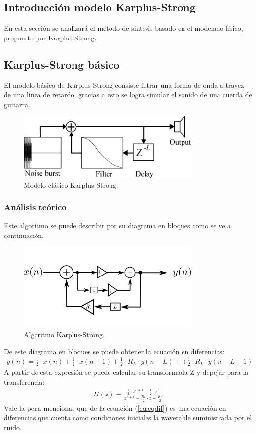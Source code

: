 



\subsection{Introducción modelo Karplus-Strong}
En esta sección se analizará el método de sintesis basado en el modelado físico, propuesto por Karplus-Strong.
\subsection{Karplus-Strong básico}
El modelo básico de Karplus-Strong consiste filtrar una forma de onda a travez de una linea de retardo, gracias a esto se logra simular el sonido de una cuerda de guitarra.
\begin{figure}[H]
	\centering
	\includegraphics[width=0.8\textwidth]{ImagenesEjercicio4/ksinit.PNG}
\caption{Modelo clásico Karplus-Strong.}
	\label{fig:kscl}
\end{figure}
\subsubsection{Análisis teórico}
Este algoritmo se puede describir por su diagrama en bloques como se ve  a continuación.
\begin{figure}[H]
	\centering
	\includegraphics[width=0.8\textwidth]{ImagenesEjercicio4/ksclasic.PNG}
\caption{Algoritmo Karplus-Strong.}
	\label{fig:ksclasico}
\end{figure}
De este diagrama en bloques se puede obtener la ecuación en diferencias:
\begin{align}
y(n) = \frac{1}{2}\cdot x(n) +\frac{1}{2}\cdot x(n-1) + \frac{1}{2}\cdot R_L \cdot y(n-L) + + \frac{1}{2}\cdot R_L \cdot y(n-L-1) 
\label{eq:eqdif}
\end{align}
A partir de esta expresión se puede calcular su transformada Z y depejar para la transferencia:
\begin{align}
H(z) = \frac{\frac{1}{2} \cdot z^{L+1} +\frac{1}{2} \cdot z^{L} }{z^{L+1} - \frac{R_L}{2} \cdot z - \frac{R_L}{2}}
\label{eq:hzks}
\end{align}  
Vale la pena mencionar que de la ecuación (\ref{eq:eqdif}) es una ecuación en diferencias que cuenta como condiciones iniciales la wavetable suministrada por el ruido.
